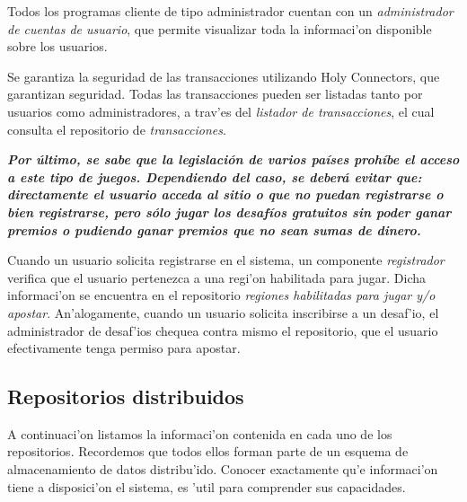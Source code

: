 Todos los programas cliente de tipo administrador cuentan con un \textit{administrador de cuentas de usuario}, que permite visualizar toda la informaci'on disponible sobre los usuarios.

Se garantiza la seguridad de las transacciones utilizando Holy Connectors, que garantizan seguridad. Todas las transacciones pueden ser listadas tanto por usuarios como administradores, a trav'es del \textit{listador de transacciones}, el cual consulta el repositorio de \textit{transacciones}.

\textbf{\textit{Por último, se sabe que la legislación de varios países prohíbe el acceso a este tipo de juegos. Dependiendo del caso, se deberá evitar que: directamente el usuario acceda al sitio o que no puedan registrarse o bien registrarse, pero sólo jugar los desafíos gratuitos sin poder ganar premios o pudiendo ganar premios que no sean sumas de dinero.}}

Cuando un usuario solicita registrarse en el sistema, un componente \textit{registrador} verifica que el usuario pertenezca a una regi'on habilitada para jugar. Dicha informaci'on se encuentra en el repositorio \textit{regiones habilitadas para jugar y/o apostar}. An'alogamente, cuando un usuario solicita inscribirse a un desaf'io, el administrador de desaf'ios chequea contra mismo el repositorio, que el usuario efectivamente tenga permiso para apostar.

\subsection{Repositorios distribuidos}

A continuaci'on listamos la informaci'on contenida en cada uno de los repositorios. Recordemos que todos ellos forman parte de un esquema de almacenamiento de datos distribu'ido. Conocer exactamente qu'e informaci'on tiene a disposici'on el sistema, es 'util para comprender sus capacidades.

